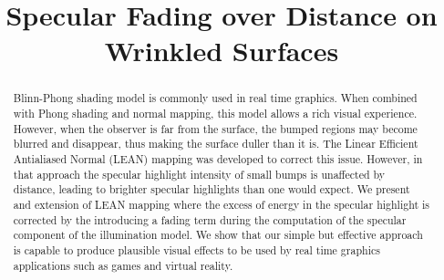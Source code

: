 \documentclass[10pt, conference]{IEEEtran}
\begin{document}
%
\title{Specular Fading over Distance on Wrinkled Surfaces}

\newif\iffinal
\finaltrue
\newcommand{\jemsid}{99999}


\iffinal
  \author{%
  }
\else
  \author{Sibgrapi paper ID: \jemsid \\ }
\fi




\maketitle


\begin{abstract}
Blinn-Phong shading model is commonly used in real time graphics. When combined with Phong shading and normal mapping, this model allows a rich visual experience. However, when the observer is far from the surface, the bumped regions may become blurred and disappear, thus making the surface duller than it is. The Linear Efficient Antialiased Normal (LEAN) mapping was developed to correct this issue. However, in that approach the specular highlight intensity of small bumps is unaffected by distance, leading to brighter specular highlights than one would expect. We present and extension of LEAN mapping where the excess of energy in the specular highlight is corrected by the introducing a fading term during the computation of the specular component of the illumination model. We show that our simple but effective approach is capable to produce plausible visual effects to be used by real time graphics applications such as games and virtual reality.

%
\end{abstract}
\end{document}
